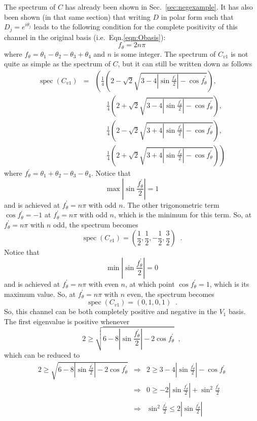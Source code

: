 The spectrum of $C$ has already been shown in Sec.\ \ref{sec:negexample}.  It has also been shown (in that same section) that writing $D$ in polar form such that $D_j=e^{i\theta_j}$ leads to the following condition for the complete positivity of this channel in the original basis (i.e.\ Eqn.\ref{eqn:Obasis}):
$$
f_\theta = 2n\pi
$$
where $f_\theta=\theta_1 - \theta_2 - \theta_3 + \theta_4$ and $n$ is some integer.  The spectrum of $C_{v1}$ is not quite as simple as the spectrum of $C$, but it can still be written down as follows
\begin{eqnarray*}
\operatorname{spec}\left(C_{v1}\right) &=& \left(\frac{1}{4}\left(2-\sqrt{2}\sqrt{3-4\left|\sin{\frac{f^\prime_\theta}{2}}\right| - \cos{f^\prime_\theta}}\right),\right.\\
& &\;\;\;\;\;\;\frac{1}{4}\left(2+\sqrt{2}\sqrt{3-4\left|\sin{\frac{f^\prime_\theta}{2}}\right| - \cos{f^\prime_\theta}}\right),\\
& &\;\;\;\;\;\;\frac{1}{4}\left(2-\sqrt{2}\sqrt{3+4\left|\sin{\frac{f^\prime_\theta}{2}}\right| - \cos{f^\prime_\theta}}\right),\\
& &\left.\;\;\;\;\;\;\frac{1}{4}\left(2+\sqrt{2}\sqrt{3+4\left|\sin{\frac{f^\prime_\theta}{2}}\right| - \cos{f^\prime_\theta}}\right)\right)
\end{eqnarray*}
where $f^\prime_\theta = \theta_1+\theta_2-\theta_3-\theta_4$.  Notice that
$$
\operatorname{max}\left|\sin{\frac{f^\prime_\theta}{2}}\right| = 1
$$
and is achieved at $f^\prime_\theta = n\pi$ with odd $n$.  The other trigonometric term $\cos{f^\prime_\theta}=-1$ at $f^\prime_\theta = n\pi$ with odd $n$, which is the minimum for this term.  So, at $f^\prime_\theta = n\pi$ with $n$ odd, the spectrum becomes
$$
\operatorname{spec}\left(C_{v1}\right) = \left(\frac{1}{2},\frac{1}{2},-\frac{1}{2},\frac{3}{2}\right)\;\;.
$$
Notice that
$$
\operatorname{min}\left|\sin{\frac{f^\prime_\theta}{2}}\right| = 0
$$
and is achieved at $f^\prime_\theta = n\pi$ with even $n$, at which point $\cos{f^\prime_\theta}=1$, which is its maximum value.  So, at $f^\prime_\theta = n\pi$ with $n$ even, the spectrum becomes
$$
\operatorname{spec}\left(C_{v1}\right) = \left(0,1,0,1\right)\;\;.
$$
So, this channel can be both completely positive and negative in the $V_1$ basis.  The first eigenvalue is positive whenever
$$
2\ge \sqrt{6-8\left|\sin{\frac{f^\prime_\theta}{2}}\right| - 2\cos{f^\prime_\theta}}\;\;,
$$
which can be reduced to
\begin{eqnarray*}
2\ge \sqrt{6-8\left|\sin{\frac{f^\prime_\theta}{2}}\right| - 2\cos{f^\prime_\theta}}
&\Rightarrow& 2\ge 3-4\left|\sin{\frac{f^\prime_\theta}{2}}\right| - \cos{f^\prime_\theta}\\
&\Rightarrow& 0\ge -2\left|\sin{\frac{f^\prime_\theta}{2}}\right| +\sin^2{\frac{f^\prime_\theta}{2}}\\
&\Rightarrow& \sin^2{\frac{f^\prime_\theta}{2}} \le 2\left|\sin{\frac{f^\prime_\theta}{2}}\right|
\end{eqnarray*}
